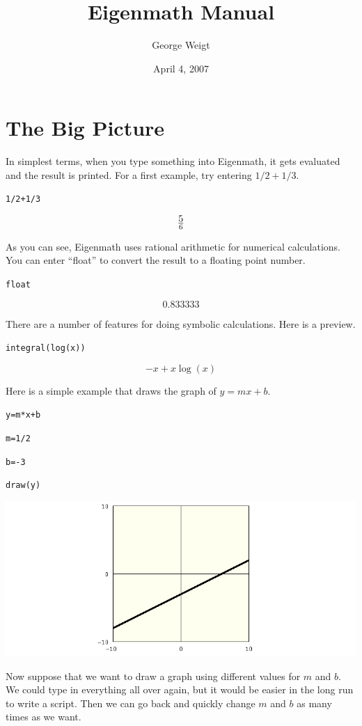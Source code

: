 \documentclass[12pt,openany]{report}
\title{Eigenmath Manual}
\author{George Weigt}
\date{April 4, 2007}
\begin{document}
\maketitle
\tableofcontents

\newpage

\chapter{The Big Picture}
In simplest terms, when you type something into Eigenmath,
it gets evaluated and the result is printed.
For a first example, try entering $1/2+1/3$.

\medskip
{\tt 1/2+1/3}

$$5\over6$$

\medskip
\noindent
As you can see, Eigenmath uses rational arithmetic for numerical calculations.
You can enter ``float'' to convert the result to a floating point number.

\medskip
{\tt float}

$$0.833333$$

\medskip
\noindent
There are a number of features for doing symbolic calculations.
Here is a preview.

\medskip
{\tt integral(log(x))}

$$-x+x\log(x)$$

\newpage

\noindent
Here is a simple example that draws the graph of $y=mx+b$.

\medskip
{\tt y=m*x+b}

{\tt m=1/2}

{\tt b=-3}

{\tt draw(y)}

\medskip
\noindent
\includegraphics[scale=0.5]{1.png}

\newpage

\noindent
Now suppose that we want to draw a graph
using different values for $m$ and $b$.
We could type in everything all over again, but it would be easier
in the long run to write a script.
Then we can go back and quickly change $m$ and $b$ as many times as we want.
\end{document}
